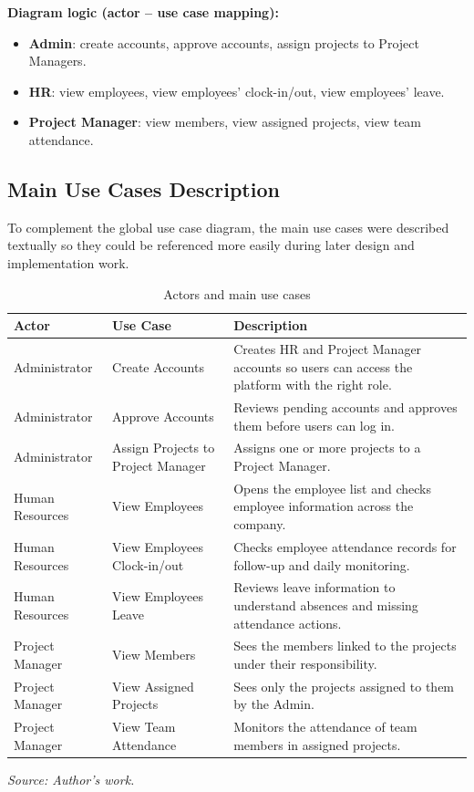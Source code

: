 \textbf{Diagram logic (actor -- use case mapping):}
\begin{itemize}[noitemsep]
	\item \textbf{Admin}: create accounts, approve accounts, assign projects to Project Managers.
	\item \textbf{HR}: view employees, view employees' clock-in/out, view employees' leave.
	\item \textbf{Project Manager}: view members, view assigned projects, view team attendance.
\end{itemize}

\subsection{Main Use Cases Description}
To complement the global use case diagram, the main use cases were described textually so they could be referenced more easily during later design and implementation work.

\begin{table}[H]
	\centering
	\renewcommand{\arraystretch}{1.2}
	\begin{tabular}{|>{\raggedright\arraybackslash}p{3.0cm}|>{\raggedright\arraybackslash}p{4.8cm}|>{\raggedright\arraybackslash}p{6.8cm}|}
		\hline
		\textbf{Actor} & \textbf{Use Case} & \textbf{Description} \\
		\hline
		Administrator & Create Accounts & Creates HR and Project Manager accounts so users can access the platform with the right role. \\
		\hline
		Administrator & Approve Accounts & Reviews pending accounts and approves them before users can log in. \\
		\hline
		Administrator & Assign Projects to Project Manager & Assigns one or more projects to a Project Manager. \\
		\hline
		Human Resources & View Employees & Opens the employee list and checks employee information across the company. \\
		\hline
		Human Resources & View Employees Clock-in/out & Checks employee attendance records for follow-up and daily monitoring. \\
		\hline
		Human Resources & View Employees Leave & Reviews leave information to understand absences and missing attendance actions. \\
		\hline
		Project Manager & View Members & Sees the members linked to the projects under their responsibility. \\
		\hline
		Project Manager & View Assigned Projects & Sees only the projects assigned to them by the Admin. \\
		\hline
		Project Manager & View Team Attendance & Monitors the attendance of team members in assigned projects. \\
		\hline
	\end{tabular}
	
	\caption{Actors and main use cases}
	\label{tab:actors-main-use-cases}
	{\footnotesize\textit{Source: Author's work.}}
\end{table}

